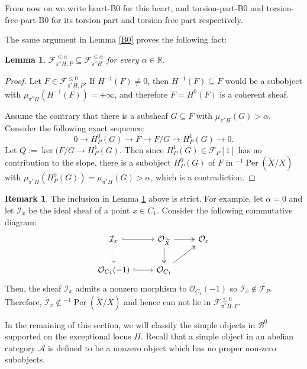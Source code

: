 \documentclass[12pt]{amsart}
\newtheorem{lemma}[theorem]{Lemma}
\theoremstyle{definition}
\newtheorem{remark}[theorem]{Remark}
\DeclareMathOperator{\Per}{Per}
\begin{document}
From now on we write \gls{heart-B0} for this heart, and \gls{torsion-part-B0} and \gls{torsion-free-part-B0} for its torsion part and torsion-free part respectively.

The same argument in Lemma \ref{B0} proves the following fact:

\begin{lemma}\label{FF}
$\mathcal{F}^{\leq \alpha}_{\pi^\ast H,P} \subseteq \mathcal{F}^{\leq \alpha}_{\pi^\ast H}$ for every $\alpha \in \mathbb{R}$.    
\end{lemma}
\begin{proof}
Let $F \in \mathcal{F}^{\leq 0}_{\pi^\ast H,P}$.
If $H^{-1}(F) \neq 0$, then $H^{-1}(F) \subseteq F$ would be a subobject with $\mu_{\pi^\ast H }(H^{-1}(F)) = + \infty$,
and therefore $F= H^0(F)$ is a coherent sheaf.

Assume the contrary that there is a subsheaf $G \subseteq F$ with $\mu_{\pi^\ast H }(G) > \alpha$.
Consider the following exact sequence:
$$ 0 \longrightarrow H^0_P(G) \longrightarrow F \longrightarrow F/G
\longrightarrow H^1_P(G)
\longrightarrow 0. $$
Let $Q:= \ker (F/G \longrightarrow H^1_P(G)$.
Then since $H^1_P(G) \in \mathcal{F}_P[1]$ has no contribution to the slope, there is a subobject  $H^0_P(G)$ of $F$ in ${^{-1}\Per(\widetilde{X}/X)}$ with $\mu_{\pi^\ast H}(H^0_P(G))= \mu_{\pi^\ast H}(G) >\alpha$,
which is a contradiction.
\end{proof}

\begin{remark}
The inclusion in Lemma \ref{FF} above is strict.
For example, let $\alpha =0$ and let $\mathcal{I}_x$ be the ideal sheaf of a point $x \in C_1$.
Consider the following commutative diagram:
\[
\begin{tikzcd}
\mathcal{I}_x \arrow[r, hook] \arrow[d, dotted] & \mathcal{O}_{\widetilde{X}} \arrow[r, two heads] \arrow[d, two heads] & \mathcal{O}_x \\
\mathcal{O}_{C_1}(-1) \arrow[r, hook]           & \mathcal{O}_{C_1} \arrow[ru, two heads]                               &              
\end{tikzcd}
\]
Then, the sheaf $\mathcal{I}_x$ admits a nonzero morphism to $\mathcal{O}_{C_1}(-1)$ so $\mathcal{I}_x \notin \mathcal{T}_P$.
Therefore, $\mathcal{I}_x \notin {^{-1}\Per(\widetilde{X}/X)}$ and hence can not lie in $\mathcal{F}^{\leq0}_{\pi^\ast H,P}$.
\end{remark}

In the remaining of this section, we will classify the simple objects in $\mathcal{B}^0$ supported on the exceptional locus $\Pi$.
Recall that a simple object in an abelian category $\mathcal{A}$ is defined to be a nonzero object which has no proper non-zero subobjects.
\end{document}
